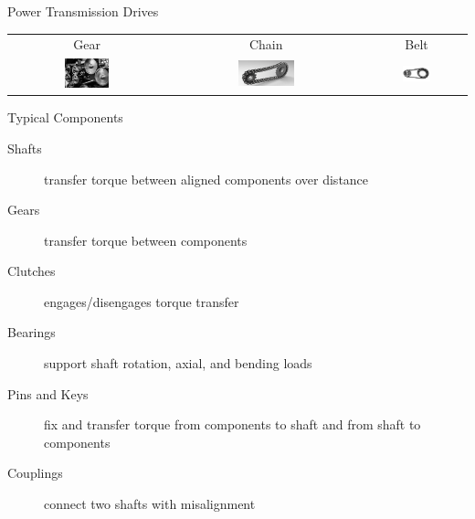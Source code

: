 \documentclass[
svgnames,
handout,
10pt,
]{beamer}
\begin{document}
\begin{frame}{Power Transmission Drives}
  \begin{table}[htbp]
    \centering
    \begin{tabular}{ccc}
      Gear & Chain & Belt \\[2em]
      \includegraphics[width=0.3\textwidth]{gear-drive} & \includegraphics[width=0.3\textwidth]{chain-drive} &         \includegraphics[width=0.3\textwidth]{belt-drive}
    \end{tabular}
  \end{table}
\end{frame}

\begin{frame}{Typical Components}
  \begin{description}
    \item[Shafts] transfer torque between aligned components over distance
    \item[Gears] transfer torque between components
    \item[Clutches] engages/disengages torque transfer
    \item[Bearings] support shaft rotation, axial, and bending loads
    \item[Pins and Keys] fix and transfer torque from components to shaft and from shaft to components
    \item[Couplings] connect two shafts with misalignment
  \end{description}
\end{frame}
\end{document}
